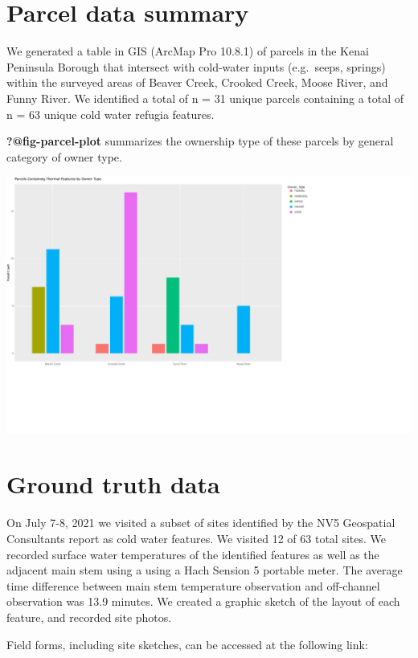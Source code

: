 \documentclass[
  letterpaper,
  DIV=11,
  numbers=noendperiod]{scrreprt}
\begin{document}
\hypertarget{parcel-data-summary}{%
\section{Parcel data summary}\label{parcel-data-summary}}

We generated a table in GIS (ArcMap Pro 10.8.1) of parcels in the Kenai
Peninsula Borough that intersect with cold-water inputs (e.g.~seeps,
springs) within the surveyed areas of Beaver Creek, Crooked Creek, Moose
River, and Funny River. We identified a total of n = 31 unique parcels
containing a total of n = 63 unique cold water refugia features.

\textbf{?@fig-parcel-plot} summarizes the ownership type of these
parcels by general category of owner type.

\includegraphics{./thermal_imagery_data_files/figure-pdf/parcel-plot-1.pdf}

\hypertarget{ground-truth-data}{%
\section{Ground truth data}\label{ground-truth-data}}

On July 7-8, 2021 we visited a subset of sites identified by the NV5
Geospatial Consultants report as cold water features. We visited 12 of
63 total sites. We recorded surface water temperatures of the identified
features as well as the adjacent main stem using a using a Hach Sension
5 portable meter. The average time difference between main stem
temperature observation and off-channel observation was 13.9 minutes. We
created a graphic sketch of the layout of each feature, and recorded
site photos.

Field forms, including site sketches, can be accessed at the following
link:
\end{document}

